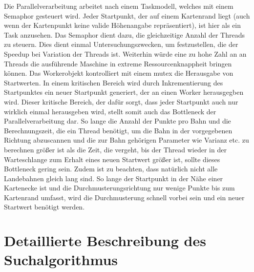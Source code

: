 \documentclass[10pt,a4paper]{report}
\begin{document}
Die Parallelverarbeitung arbeitet nach einem Taskmodell, welches mit einem Semaphor gesteuert wird. Jeder Startpunkt, der auf einem Kartenrand liegt (auch wenn der Kartenpunkt keine valide Höhenangabe repräsentiert), ist hier als ein Task anzusehen. Das Semaphor dient dazu, die gleichzeitige Anzahl der Threads zu steuern. Dies dient einmal Untersuchungszwecken, um festzustellen, die der Speedup bei Variation der Threads ist. Weiterhin würde eine zu hohe Zahl an an Threads die ausführende Maschine in extreme Ressourcenknappheit bringen können.
Das Workerobjekt kontrolliert mit einem mutex die Herausgabe von Startwerten. In einem kritischen Bereich wird durch Inkrementierung des Startpunktes ein neuer Startpunkt generiert, der an einen Worker herausgegben wird. Dieser kritische Bereich, der dafür sorgt, dass jeder Startpunkt auch nur wirklich einmal herausgeben wird, stellt somit auch das Bottleneck der Parallelverarbeitung dar. So lange die Anzahl der Punkte pro Bahn und die Berechnungszeit, die ein Thread benötigt, um die Bahn in der vorgegebenen Richtung abzuscannen und die zur Bahn gehörigen Parameter wie Varianz etc. zu berechnen größer ist als die Zeit, die vergeht, bis der Thread wieder in der Warteschlange zum Erhalt eines neuen Startwert größer ist, sollte dieses Bottleneck gering sein.
Zudem ist zu beachten, dass natürlich nicht alle Landebahnen gleich lang sind. So lange der Startpunkt in der Nähe einer Kartenecke ist und die Durchmusterungsrichtung nur wenige Punkte bis zum Kartenrand umfasst, wird die Durchmusterung schnell vorbei sein und ein neuer Startwert benötigt werden. 

\section{Detaillierte Beschreibung des Suchalgorithmus}
\end{document}

